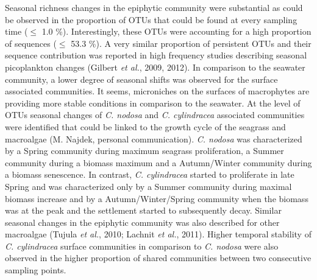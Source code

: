 \documentclass[12pt,]{article}
\begin{document}
Seasonal richness changes in the epiphytic community were substantial as
could be observed in the proportion of OTUs that could be found at every
sampling time (\(\leq\) 1.0 \si{\percent}). Interestingly, these OTUs
were accounting for a high proportion of sequences (\(\leq\) 53.3
\si{\percent}). A very similar proportion of persistent OTUs and their
sequence contribution was reported in high frequency studies describing
seasonal picoplankton changes (Gilbert \emph{et al.}, 2009, 2012). In
comparison to the seawater community, a lower degree of seasonal shifts
was observed for the surface associated communities. It seems,
microniches on the surfaces of macrophytes are providing more stable
conditions in comparison to the seawater. At the level of OTUs seasonal
changes of \emph{C. nodosa} and \emph{C. cylindracea} associated
communities were identified that could be linked to the growth cycle of
the seagrass and macroalgae (M. Najdek, personal communication).
\emph{C. nodosa} was characterized by a Spring community during maximum
seagrass proliferation, a Summer community during a biomass maximum and
a Autumn/Winter community during a biomass senescence. In contrast,
\emph{C. cylindracea} started to proliferate in late Spring and was
characterized only by a Summer community during maximal biomass increase
and by a Autumn/Winter/Spring community when the biomass was at the peak
and the settlement started to subsequently decay. Similar seasonal
changes in the epiphytic community was also described for other
macroalgae (Tujula \emph{et al.}, 2010; Lachnit \emph{et al.}, 2011).
Higher temporal stability of \emph{C. cylindracea} surface communities
in comparison to \emph{C. nodosa} were also observed in the higher
proportion of shared communities between two consecutive sampling
points.
\end{document}
